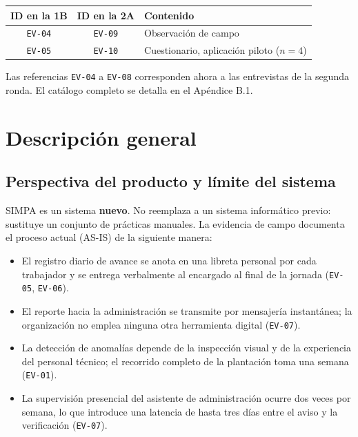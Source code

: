 \documentclass[11pt,a4paper]{article}
\newcommand{\id}[1]{\texttt{\begingroup\hyphenpenalty=10000\relax#1\endgroup}}
\renewcommand{\id}[1]{\texttt{#1}}
\begin{document}
\begin{center}
\begin{tabular}{|c|c|l|}
\hline
\rowcolor{grisclaro}\textbf{ID en la 1B} & \textbf{ID en la 2A} & \textbf{Contenido} \\ \hline
\id{EV-04} & \id{EV-09} & Observación de campo \\ \hline
\id{EV-05} & \id{EV-10} & Cuestionario, aplicación piloto ($n=4$) \\ \hline
\end{tabular}
\end{center}

\vspace{0.3cm}
\noindent Las referencias \id{EV-04} a \id{EV-08} corresponden ahora a las entrevistas de la segunda
ronda. El catálogo completo se detalla en el Apéndice B.1.

\newpage
\section{Descripción general}

\subsection{Perspectiva del producto y límite del sistema}

SIMPA es un sistema \textbf{nuevo}. No reemplaza a un sistema informático previo: sustituye un
conjunto de prácticas manuales. La evidencia de campo documenta el proceso actual (AS-IS) de la
siguiente manera:

\begin{itemize}[nosep]
  \item El registro diario de avance se anota en una libreta personal por cada trabajador y se
        entrega verbalmente al encargado al final de la jornada (\id{EV-05}, \id{EV-06}).
  \item El reporte hacia la administración se transmite por mensajería instantánea; la
        organización no emplea ninguna otra herramienta digital (\id{EV-07}).
  \item La detección de anomalías depende de la inspección visual y de la experiencia del personal
        técnico; el recorrido completo de la plantación toma una semana (\id{EV-01}).
  \item La supervisión presencial del asistente de administración ocurre dos veces por semana, lo
        que introduce una latencia de hasta tres días entre el aviso y la verificación (\id{EV-07}).
\end{itemize}
\end{document}
